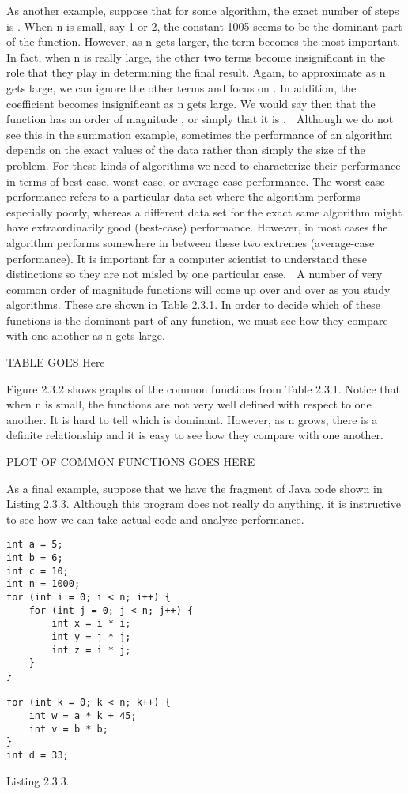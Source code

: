 As another example, suppose that for some algorithm, the exact number of steps is .
When n is small, say 1 or 2, the constant 1005 seems to be the dominant part of the function. However, as n gets larger, the term becomes the most important. In fact, when n is really large, the other two terms become insignificant in the role that they play in determining the final result. Again, to approximate as n gets large, we can ignore the other terms and focus on . In addition, the coefficient becomes insignificant as n gets large. We would say then that the function has an order of magnitude , or simply that it is .
🔗
Although we do not see this in the summation example, sometimes the performance of an algorithm depends on the exact values of the data rather than simply the size of the problem. For these kinds of algorithms we need to characterize their performance in terms of best-case, worst-case, or average-case performance. The worst-case performance refers to a particular data set where the algorithm performs especially poorly, whereas a different data set for the exact same algorithm might have extraordinarily good (best-case) performance. However, in most cases the algorithm performs somewhere in between these two extremes (average-case performance). It is important for a computer scientist to understand these distinctions so they are not misled by one particular case.
🔗
A number of very common order of magnitude functions will come up over and over as you study algorithms. These are shown in Table 2.3.1. In order to decide which of these functions is the dominant part of any
function, we must see how they compare with one another as n gets large.

TABLE GOES Here


Figure 2.3.2 shows graphs of the common functions from Table 2.3.1. Notice that when n is small, the functions are not very well defined with respect to one another. It is hard to tell which is dominant. However, as n grows, there is a definite relationship and it is easy to see how they compare with one another.

PLOT OF COMMON FUNCTIONS GOES HERE

As a final example, suppose that we have the fragment of Java code shown in Listing 2.3.3. Although this program does not really do anything, it is instructive to see how we can take actual code and analyze performance.
\begin{verbatim}
int a = 5;
int b = 6;
int c = 10;
int n = 1000;
for (int i = 0; i < n; i++) {
	for (int j = 0; j < n; j++) {
		int x = i * i;
		int y = j * j;
		int z = i * j;
	}
}

for (int k = 0; k < n; k++) {
	int w = a * k + 45;
	int v = b * b;
}
int d = 33;
\end{verbatim}
Listing 2.3.3.


